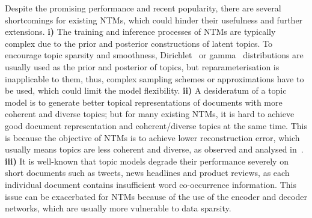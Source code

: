\documentclass{article}
\begin{document}
Despite the promising performance and recent popularity, there are several shortcomings for existing NTMs, which could hinder their usefulness and further extensions.
\textbf{i)} The training and inference processes of NTMs are typically complex due to the prior and posterior constructions of latent topics.
To encourage topic sparsity and smoothness, Dirichlet~\citep{burkhardt2019decoupling} or gamma~\citep{zhang2018whai} distributions are usually used as 
the prior and posterior of topics, but reparameterisation is inapplicable to them, thus, complex sampling schemes or approximations have to be used, which could limit the model flexibility.
\textbf{ii)} A desideratum of a topic model is to generate better topical representations of documents with more coherent and diverse topics; 
but for many existing NTMs, it is hard to achieve good document representation and coherent/diverse topics at the same time.
This is because the objective of NTMs is to achieve lower reconstruction error, which usually means topics are less coherent and diverse, as observed and analysed in~\cite{srivastava2017autoencoding,burkhardt2019decoupling}. 
\textbf{iii)} It is well-known that topic models degrade their performance severely on short documents such as tweets, news headlines and product reviews, as each individual document contains insufficient word co-occurrence information.
This issue can be exacerbated for NTMs because of the use of the encoder and decoder networks, which are usually more vulnerable to data sparsity.
\end{document}
